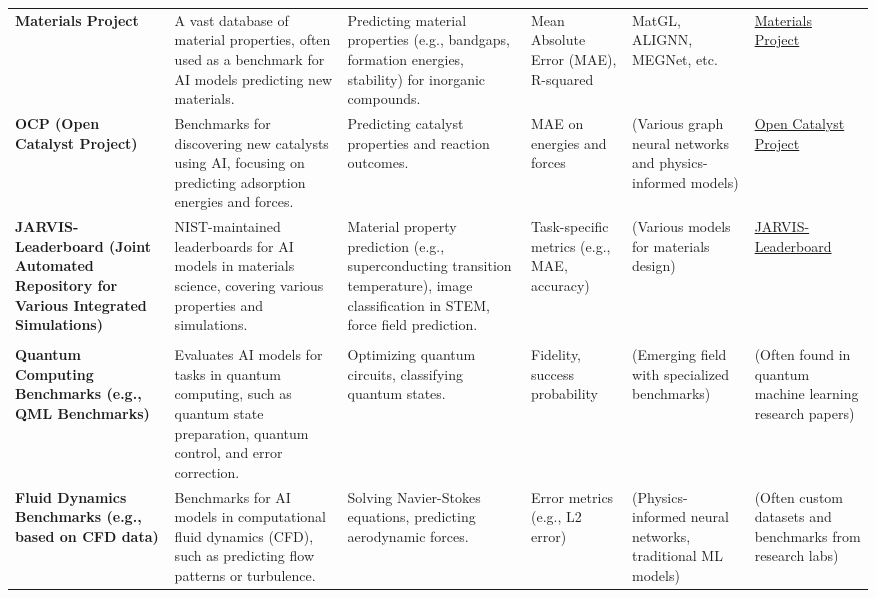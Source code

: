 \begin{landscape}
\begin{longtable}{|p{3.5cm}|p{5.5cm}|p{4cm}|p{1.8cm}|p{3.2cm}|p{2.7cm}|}
\rowcolor{gray!20}
\multicolumn{6}{|l|}{\textbf{Materials Science \& Chemistry}} \\
\hline
\textbf{Materials Project} & A vast database of material properties, often used as a benchmark for AI models predicting new materials. & Predicting material properties (e.g., bandgaps, formation energies, stability) for inorganic compounds. & Mean Absolute Error (MAE), R-squared & MatGL, ALIGNN, MEGNet, etc. & \href{https://materialsproject.org/}{Materials Project} \\
\hline
\textbf{OCP (Open Catalyst Project)} & Benchmarks for discovering new catalysts using AI, focusing on predicting adsorption energies and forces. & Predicting catalyst properties and reaction outcomes. & MAE on energies and forces & (Various graph neural networks and physics-informed models) & \href{https://opencatalystproject.org/}{Open Catalyst Project} \\
\hline
\textbf{JARVIS-Leaderboard (Joint Automated Repository for Various Integrated Simulations)} & NIST-maintained leaderboards for AI models in materials science, covering various properties and simulations. & Material property prediction (e.g., superconducting transition temperature), image classification in STEM, force field prediction. & Task-specific metrics (e.g., MAE, accuracy) & (Various models for materials design) & \href{https://pages.nist.gov/jarvis_leaderboard/}{JARVIS-Leaderboard} \cite{jarvis}\\
\hline %

\rowcolor{gray!20}
\multicolumn{6}{|l|}{\textbf{Physics \& Engineering}} \\
\hline
\textbf{Quantum Computing Benchmarks (e.g., QML Benchmarks)} & Evaluates AI models for tasks in quantum computing, such as quantum state preparation, quantum control, and error correction. & Optimizing quantum circuits, classifying quantum states. & Fidelity, success probability & (Emerging field with specialized benchmarks) & (Often found in quantum machine learning research papers) \\
\hline
\textbf{Fluid Dynamics Benchmarks (e.g., based on CFD data)} & Benchmarks for AI models in computational fluid dynamics (CFD), such as predicting flow patterns or turbulence. & Solving Navier-Stokes equations, predicting aerodynamic forces. & Error metrics (e.g., L2 error) & (Physics-informed neural networks, traditional ML models) & (Often custom datasets and benchmarks from research labs) \\
\hline %


\end{longtable}
\end{landscape}
